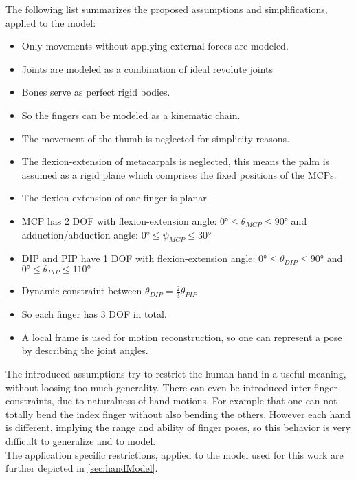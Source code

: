 The following list summarizes the proposed assumptions and simplifications, applied to the model:
\begin{itemize}
\item Only movements without applying external forces are modeled.
\item Joints are modeled as a combination of ideal revolute joints
\item Bones serve as perfect rigid bodies.
\item So the fingers can be modeled as a kinematic chain.
\item The movement of the thumb is neglected for simplicity reasons.
\item The flexion-extension of metacarpals is neglected, this means the palm is assumed as a rigid plane which comprises the fixed positions of the \acp{MCP}.
\item The flexion-extension of one finger is planar
\item \ac{MCP} has 2 \ac{DOF} with flexion-extension angle: $ \ang{0} \leq \theta_{MCP} \leq \ang{90} $ and adduction/abduction angle: $ \ang{0} \leq \psi_{MCP} \leq \ang{30} $
\item \ac{DIP} and \ac{PIP} have 1 DOF with flexion-extension angle: $ \ang{0} \leq \theta_{DIP} \leq \ang{90} $ and $ \ang{0} \leq \theta_{PIP} \leq \ang{110} $
\item Dynamic constraint between $ \theta_{DIP} = \frac{2}{3} \theta_{PIP} $
\item So each finger has 3 \ac{DOF} in total.
\item A local frame is used for motion reconstruction, so one can represent a pose by describing the joint angles.
\end{itemize}

The introduced assumptions try to restrict the human hand in a useful meaning, without loosing too much generality. There can even be introduced inter-finger constraints, due to naturalness of hand motions. For example that one can not totally bend the index finger without also bending the others. However each hand is different, implying the range and ability of finger poses, so this behavior is very difficult to generalize and to model.\\
The application specific restrictions, applied to the model used for this work are further depicted in \ref{sec:handModel}.




